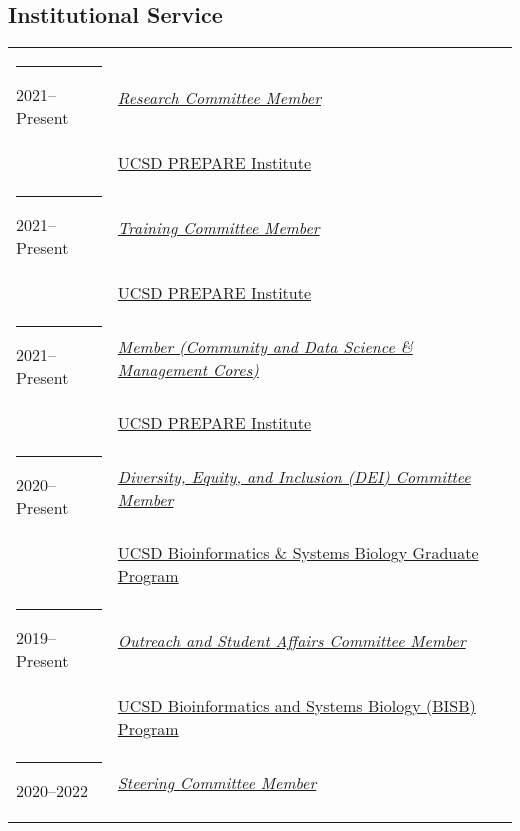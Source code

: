 \documentclass[margin,line]{res}
\begin{document}
\begin{resume}
\section{\sc Institutional Service}
\begin{longtable}{@{}p{0.7in}p{4in}}\rule{-1mm}{4.5mm}
\hspace*{-4mm} 2021--Present & \href{https://prepare.ucsd.edu/cores/}{\textit{Research Committee Member}}\\*
\hspace*{-4mm} & \hspace{4mm} \href{https://prepare.ucsd.edu/}{UCSD PREPARE Institute}\\
\hspace*{-4mm} \rule{-1mm}{5mm} 2021--Present & \href{https://prepare.ucsd.edu/cores/}{\textit{Training Committee Member}}\\*
\hspace*{-4mm} & \hspace{4mm} \href{https://prepare.ucsd.edu/}{UCSD PREPARE Institute}\\
\hspace*{-4mm} \rule{-1mm}{5mm} 2021--Present & \href{https://prepare.ucsd.edu/cores/}{\textit{Member (Community and Data Science \& Management Cores)}}\\*
\hspace*{-4mm} & \hspace{4mm} \href{https://prepare.ucsd.edu/}{UCSD PREPARE Institute}\\
\hspace*{-4mm} \rule{-1mm}{5mm} 2020--Present & \href{https://bioinformatics.ucsd.edu/node/3/}{\textit{Diversity, Equity, and Inclusion (DEI) Committee Member}}\\*
\hspace*{-4mm} & \hspace{4mm} \href{https://bioinformatics.ucsd.edu/}{UCSD Bioinformatics \& Systems Biology Graduate Program}\\
\hspace*{-4mm} \rule{-1mm}{5mm} 2019--Present & \href{https://bioinformatics.ucsd.edu/node/3/}{\textit{Outreach and Student Affairs Committee Member}}\\*
\hspace*{-4mm} & \hspace{4mm} \href{https://bioinformatics.ucsd.edu/}{UCSD Bioinformatics and Systems Biology (BISB) Program}\\
\hspace*{-4mm} \rule{-1mm}{5mm} 2020--2022 & \href{https://camsee.ucsd.edu/}{\textit{Steering Committee Member}}\\*

\end{longtable}
\end{resume}
\end{document}
